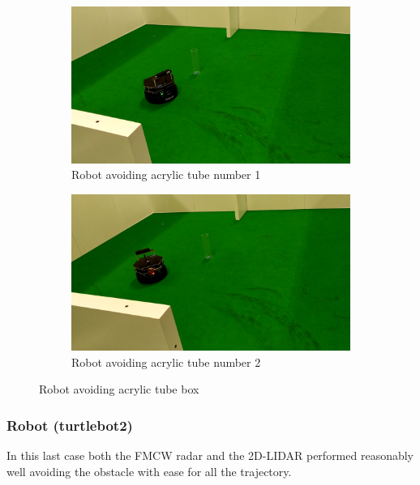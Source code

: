 \begin{figure}[ht!]
  \centering
  \begin{subfigure}[b]{0.49\linewidth}
    \includegraphics[width=\linewidth]{imgs/chapter5/glassRS1.png}
     \caption{Robot avoiding acrylic tube number 1}
     \label{fig::glassRS1}
  \end{subfigure}
  \begin{subfigure}[b]{0.49\linewidth}
    \includegraphics[width=\linewidth]{imgs/chapter5/glassRS2.png}
    \caption{Robot avoiding acrylic tube  number 2}
    \label{fig::glassRS2}
  \end{subfigure}
  \caption{Robot avoiding acrylic tube box}
  \label{fig:glassRS}
\end{figure}

\subsubsection{Robot  (turtlebot2) }
In this last case both the \ac{FMCW} \ac{radar} and the 2D-LIDAR performed reasonably well avoiding the obstacle with ease for all the trajectory.

